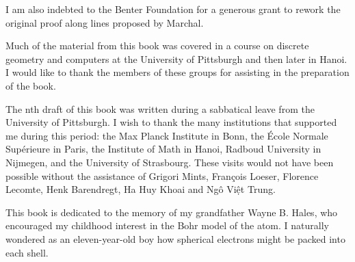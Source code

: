 I am also indebted to the Benter Foundation for a generous grant to rework the original
proof along lines proposed by Marchal.

Much of the material from this book was covered
in a course on discrete geometry and computers at the University of
Pittsburgh and then later %
in Hanoi.  I would like to thank the members of these
groups for assisting in the preparation of the book.

The nth draft of this book was written during a sabbatical leave from the
University of Pittsburgh.  I wish to thank the many institutions that
supported me during this period: the Max Planck Institute in Bonn, the
\'Ecole Normale Sup\'erieure in Paris, the Institute of Math in Hanoi, Radboud
University in Nijmegen, and the University of Strasbourg.  These visits would not
have been possible without the assistance of  Grigori Mints, Fran\c{c}ois Loeser,
Florence Lecomte, Henk Barendregt, Ha Huy Khoai and Ng\^o Vi\d{\^e}t Trung.

\bigskip

This book is dedicated to the memory of my grandfather Wayne B. Hales,
who encouraged my childhood interest in the Bohr model of the atom.  I
naturally wondered as an eleven-year-old boy how spherical electrons might
be packed into each shell.

